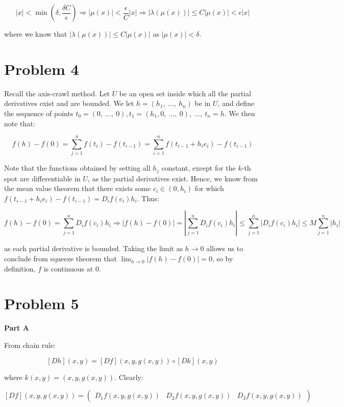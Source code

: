 \documentclass[10pt, oneside]{amsart}
\begin{document}
    $$|x| < \min \left( \delta, \frac{\delta C}{\epsilon} \right) \Rightarrow |\mu(x)| < \frac{\epsilon}{C} |x| \Rightarrow |\lambda(\mu(x))| \leq C |\mu(x)| < \epsilon|x|$$

    where we know that $|\lambda(\mu(x))| \leq C |\mu(x)|$ as $|\mu(x)| < \delta$.

    \section{Problem 4}

    Recall the axis-crawl method. Let $U$ be an open set inside which all the partial derivatives exist and are bounded. We let $h = (h_1, \ ..., \ h_n)$ be in $U$, and define the sequence of points
    $t_0 = (0, \ ..., \ 0), t_1 = (h_1, 0, \ ..., \ 0), \ ..., \ t_n = h$. We then note that:

    $$f(h) - f(0) = \displaystyle\sum_{j = 1}^{n} f(t_i) - f(t_{i - 1}) = \displaystyle\sum_{i = 1}^{n} f(t_{i - 1} + h_i e_i) - f(t_{i - 1})$$

    Note that the functions obtained by setting all $h_j$ constant, except for the $k$-th spot are differentiable in $U$, as the partial derivatives exist. Hence, we know from the mean value theorem
    that there exists some $c_i \in (0, h_i)$ for which $f(t_{i - 1} + h_i e_i) - f(t_{i - 1}) = D_i f(c_i) h_i$. Thus:

    $$f(h) - f(0) = \displaystyle\sum_{j = 1}^{n} D_i f(c_i) h_i \Rightarrow |f(h) - f(0)| = \left| \displaystyle\sum_{j = 1}^{n} D_i f(c_i) h_i \right| \leq \displaystyle\sum_{j = 1}^{n} |D_i f(c_i) h_i| \leq M \displaystyle\sum_{j = 1}^{n} |h_i|$$

    as each partial derivative is bounded. Taking the limit as $h \rightarrow 0$ allows us to conclude from squeeze theorem that $\lim_{h \to 0} |f(h) - f(0)| = 0$, so by definition, $f$ is continuous at $0$.

    \section{Problem 5}

    \textbf{Part A}
    \newline

    From chain rule:

    $$[Dh](x, y) = [Df](x, y, g(x, y)) \circ [D k](x, y)$$

    where $k(x, y) = (x, y, g(x, y))$. Clearly:

    $$[Df](x, y, g(x, y)) = \begin{pmatrix} D_1 f(x, y, g(x, y)) & D_2 f(x, y, g(x, y)) & D_3 f(x, y, g(x, y)) \end{pmatrix}$$
\end{document}
